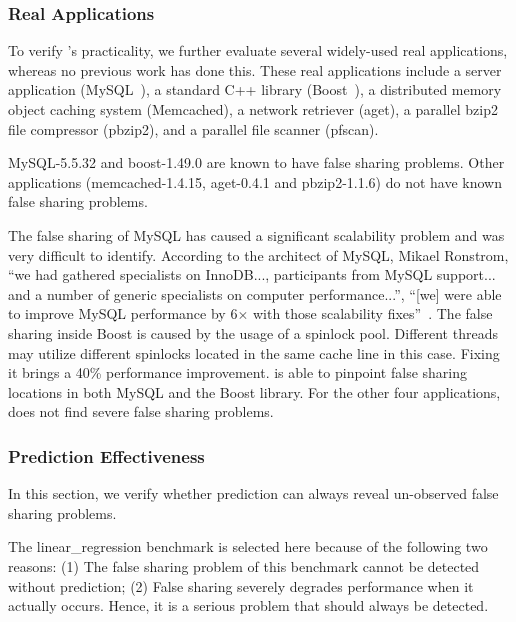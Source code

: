 \subsubsection{Real Applications}
To verify \Predator{}'s practicality, we further evaluate several widely-used real applications, whereas no previous work has done this. These real applications include a server application (MySQL~\cite{mysql}),
a standard C++ library (Boost~\cite{libfalsesharing}),
a distributed memory object caching system (Memcached), a network retriever (aget),
a parallel bzip2 file compressor (pbzip2), and a parallel file scanner (pfscan).

MySQL-5.5.32 and boost-1.49.0 are known to have false sharing problems. Other applications (memcached-1.4.15, aget-0.4.1 and pbzip2-1.1.6) do not have known false sharing problems.

The false sharing of MySQL has caused a significant scalability problem and was very difficult to identify.
According to the architect of MySQL, Mikael Ronstrom, ``we had gathered specialists on InnoDB..., participants from MySQL support... and a number of generic specialists on 
computer performance...'', ``[we] were able to improve MySQL performance by 6$\times$ with those scalability fixes''~\cite{mysql}. 
The false sharing inside Boost is caused by the usage of a  spinlock pool. Different threads may utilize different spinlocks located in the same cache line in this case. Fixing it brings a 40\% performance improvement.
\Predator{} is able to pinpoint false sharing locations in both MySQL and the Boost library. 
For the other four applications, \Predator{} does not find severe false sharing problems.

\subsubsection{Prediction Effectiveness}
\label{sec:predicteval}
In this section, we verify whether prediction can always  reveal un-observed false sharing problems.

The linear\_regression benchmark is selected here because of the following two reasons: (1) The false sharing problem of this benchmark cannot be detected without prediction; (2) False sharing severely degrades performance when it actually occurs. Hence, it is a serious problem that should always be detected. 

